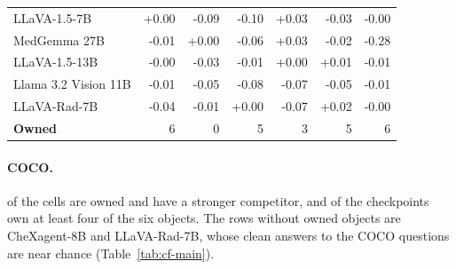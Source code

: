 \documentclass{article}
\begin{document}
\begin{table}[htbp]
{\begin{tabular}{lrrrrrr}
LLaVA-1.5-7B & \cellcolor{cfTerra1}+0.00 & \cellcolor{cfSlate2}-0.09 & \cellcolor{cfSlate2}-0.10 & \cellcolor{cfTerra2}+0.03 & \cellcolor{cfSlate2}-0.03 & \cellcolor{cfSlate1}-0.00 \\
MedGemma 27B & \cellcolor{cfSlate1}-0.01 & \cellcolor{cfTerra1}+0.00 & \cellcolor{cfSlate2}-0.06 & \cellcolor{cfTerra2}+0.03 & \cellcolor{cfSlate1}-0.02 & \cellcolor{cfSlate4}-0.28 \\
LLaVA-1.5-13B & \cellcolor{cfSlate1}-0.00 & \cellcolor{cfSlate2}-0.03 & \cellcolor{cfSlate1}-0.01 & \cellcolor{cfTerra1}+0.00 & \cellcolor{cfTerra1}+0.01 & \cellcolor{cfSlate1}-0.01 \\
Llama 3.2 Vision 11B & \cellcolor{cfSlate1}-0.01 & \cellcolor{cfSlate2}-0.05 & \cellcolor{cfSlate2}-0.08 & \cellcolor{cfSlate2}-0.07 & \cellcolor{cfSlate2}-0.05 & \cellcolor{cfSlate1}-0.01 \\
LLaVA-Rad-7B & \cellcolor{cfSlate2}-0.04 & \cellcolor{cfSlate1}-0.01 & \cellcolor{cfTerra1}+0.00 & \cellcolor{cfSlate2}-0.07 & \cellcolor{cfTerra2}+0.02 & \cellcolor{cfSlate1}-0.00 \\
\midrule
\textbf{Owned} & 6 & 0 & 5 & 3 & 5 & 6 \\
\bottomrule
\end{tabular}}
\end{table}

\paragraph{COCO.} \cfCocoOwned{} of the \cfCocoOwnedN{} cells are owned and \cfCocoCompetitor{} have a stronger competitor, and \cfCocoBlocksFourPlus{} of the \cfCocoBlocks{} checkpoints own at least four of the six objects. The rows without owned objects are CheXagent-8B and LLaVA-Rad-7B, whose clean answers to the COCO questions are near chance (Table~\ref{tab:cf-main}).
\end{document}
